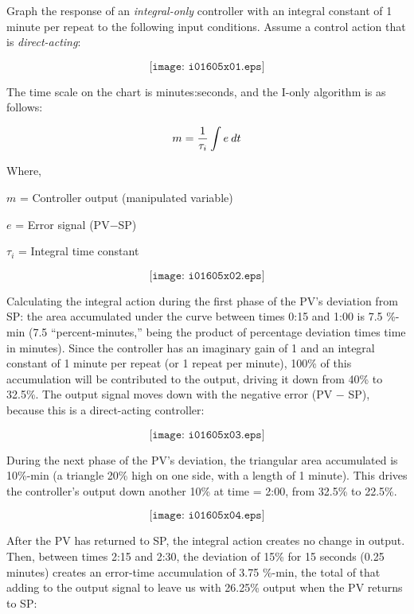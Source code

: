 

Graph the response of an {\it integral-only} controller with an integral constant of 1 minute per repeat to the following input conditions.  Assume a control action that is {\it direct-acting}:

$$\texttt{[image: i01605x01.eps]}$$

The time scale on the chart is minutes:seconds, and the I-only algorithm is as follows:

$$m = {1 \over \tau_i} \int e \> dt$$

\noindent
Where,

$m$ = Controller output (manipulated variable)

$e$ = Error signal (PV$-$SP)

$\tau_i$ = Integral time constant

\vskip 10pt







$$\texttt{[image: i01605x02.eps]}$$

Calculating the integral action during the first phase of the PV's deviation from SP: the area accumulated under the curve between times 0:15 and 1:00 is 7.5 \%-min (7.5 ``percent-minutes,'' being the product of percentage deviation times time in minutes).  Since the controller has an imaginary gain of 1 and an integral constant of 1 minute per repeat (or 1 repeat per minute), 100\% of this accumulation will be contributed to the output, driving it down from 40\% to 32.5\%.  The output signal moves down with the negative error (PV $-$ SP), because this is a direct-acting controller:
 
$$\texttt{[image: i01605x03.eps]}$$

During the next phase of the PV's deviation, the triangular area accumulated is 10\%-min (a triangle 20\% high on one side, with a length of 1 minute).  This drives the controller's output down another 10\% at time = 2:00, from 32.5\% to 22.5\%.
 
$$\texttt{[image: i01605x04.eps]}$$

After the PV has returned to SP, the integral action creates no change in output.  Then, between times 2:15 and 2:30, the deviation of 15\% for 15 seconds (0.25 minutes) creates an error-time accumulation of 3.75 \%-min, the total of that adding to the output signal to leave us with 26.25\% output when the PV returns to SP:
 
